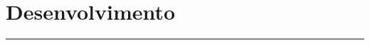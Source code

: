 \chapter{Desenvolvimento}\label{chp:desenvol}
\vspace{-1.5cm}
\noindent\rule{\columnwidth}{1.2mm}


